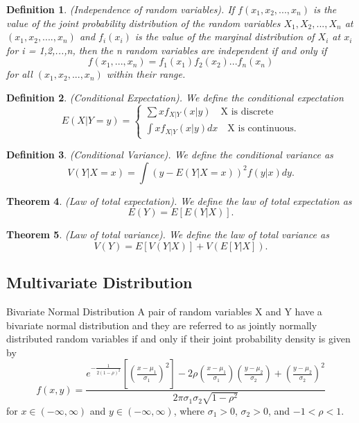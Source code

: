 \documentclass[twoside]{article}
\newcounter{lecnum}
\newtheorem{theorem}{Theorem}[lecnum]
\newtheorem{definition}[theorem]{Definition}
\begin{document}
\begin{definition}(Independence of random variables). If $f(x_1,x_2,...,x_n)$ is the value of the joint probability distribution of the random variables $X_1,X_2,...,X_n$ at $(x_1,x_2,....,x_n)$ and $f_i(x_i)$ is the value of the marginal distribution of $X_i$ at $x_i$ for i = 1,2,...,n, then the n random variables are independent if and only if 
$$
f(x_1,...,x_n) = f_1(x_1)f_2(x_2)...f_n(x_n)
$$
for all $(x_1,x_2,...,x_n)$ within their range.
\end{definition}

\begin{definition}(Conditional Expectation). We define the conditional expectation 
$$
E(X|Y=y) = \begin{cases}
\sum xf_{X|Y}(x|y) \quad \text{X is discrete}\\
\int xf_{X|Y}(x|y)dx \quad \text{X is continuous}.
\end{cases}
$$
\end{definition}

\begin{definition}(Conditional Variance). We define the conditional variance as 
$$
V(Y|X=x) = \int (y - E(Y|X=x))^2f(y|x)dy.
$$
\end{definition}

\begin{theorem}(Law of total expectation). We define the law of total expectation as
$$
E(Y) = E[E(Y|X)].
$$
\end{theorem}


\begin{theorem}(Law of total variance). We define the law of total variance as 
$$
V(Y) = E[V(Y|X)] + V(E[Y|X]).
$$
\end{theorem}

\subsection{Multivariate Distribution}

\begin{definition_exam}{Bivariate Normal Distribution}{} A pair of random variables X and Y have a bivariate normal distribution and they are referred to as jointly normally distributed random variables if and only if their joint probability density is given by 
$$
f(x,y) = \frac{e^{-\frac{1}{2(1 - \rho)^2}} [(\frac{x - \mu_1}{\sigma_1})^2] -2\rho(\frac{x - \mu_1}{\sigma_1})(\frac{y - \mu_2}{\sigma_2}) + (\frac{y - \mu_2}{\sigma_2})^2 }{2\pi \sigma_1\sigma_2\sqrt{1 - \rho^2}}
$$
for $x \in (-\infty, \infty)$ and $y \in (-\infty, \infty)$, where $\sigma_1 > 0$, $\sigma_2 > 0$, and $-1 < \rho < 1.$
\end{definition_exam}
\end{document}
